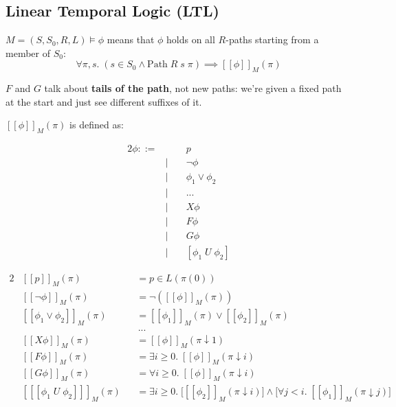 \documentclass[a4paper, 11pt]{article}
\newcommand{\interp}[2][]{\mathcal{#1}[\![#2]\!]}
\begin{document}
{    \subsection*{Linear Temporal Logic (LTL)}
    {
        \(M = (S,S_0,R,L) \vDash \phi\) means that \(\phi\) holds on all \(R\)-paths starting from a member of \(S_0\):
        \[\forall \pi,s.\; (s \in S_0 \wedge \text{Path}\;R\;s\;\pi) \implies \interp{\phi}_M(\pi)\]

        \(F\) and \(G\) talk about \textbf{tails of the path}, not new paths: we're given a fixed path at the start and just see different suffixes of it.

        \(\interp{\phi}_M(\pi)\) is defined as:

        \vspace{-8mm}
        \begin{minipage}[t]{0.3\textwidth}
        \begin{alignat*}{2}
        \phi ::=& \; &\;& p \tag*{Atomic proposition} \\
                & | && \neg \phi \tag*{Negation} \\
                & | && \phi_1 \vee \phi_2 \tag*{Disjunction} \\
                & | && ... \\
                & | && X\phi \tag*{Successor} \\
                & | && F\phi \tag*{Sometimes} \\
                & | && G\phi \tag*{Always} \\
                & | && [\phi_1\;U\;\phi_2] \tag*{Until}
        \end{alignat*}
        \end{minipage}
        \hspace{4mm}
        \begin{minipage}[t]{0.66\textwidth}
        \begin{alignat*}{2}
        &\interp{p}_M(\pi)                   &&= p \in L(\pi(0)) \\
        &\interp{\neg \phi}_M(\pi)           &&= \neg(\interp{\phi}_M(\pi)) \\
        &\interp{\phi_1 \vee \phi_2}_M(\pi)  &&= \interp{\phi_1}_M(\pi) \vee \interp{\phi_2}_M(\pi) \\
        &                                    &&\,... \\
        &\interp{X\phi}_M(\pi)               &&= \interp{\phi}_M(\pi \downarrow 1) \\
        &\interp{F\phi}_M(\pi)               &&= \exists i \geq 0.\; \interp{\phi}_M(\pi \downarrow i) \\
        &\interp{G\phi}_M(\pi)               &&= \forall i \geq 0.\; \interp{\phi}_M(\pi \downarrow i) \\
        &\interp{[\phi_1\;U\;\phi_2]}_M(\pi) &&= \exists i \geq 0.\; \Big[\interp{\phi_2}_M(\pi \downarrow i)\Big] \wedge \Big[\forall j < i.\; \interp{\phi_1}_M(\pi \downarrow j)\Big]
        \end{alignat*}
        \end{minipage}

}}
\end{document}
